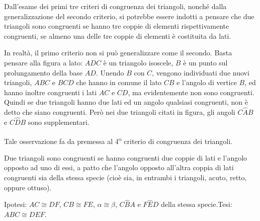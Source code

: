 \osservazione Dall'esame dei primi tre criteri di congruenza dei triangoli, nonché dalla generalizzazione del secondo criterio, si potrebbe essere indotti a pensare che due triangoli sono congruenti se hanno tre coppie di elementi rispettivamente congruenti, se almeno una delle tre coppie di elementi è costituita da lati.

\noindent \begin{minipage}{0.6\textwidth}
In realtà, il primo criterio non si può generalizzare come il secondo. Basta pensare alla figura a lato: $ADC$ è un triangolo isoscele, $B$ è un punto sul prolungamento della base $AD$. Unendo $B$ con $C$, vengono individuati due nuovi triangoli, $ABC$ e $BCD$ che hanno in comune il lato $CB$ e l'angolo di vertice $B$, ed hanno inoltre congruenti i lati $AC$ e $CD$, ma evidentemente non sono congruenti. Quindi se due triangoli hanno due lati ed un angolo qualsiasi congruenti, non è detto che siano congruenti. Però nei due triangoli citati in figura, gli angoli $C\widehat{A}B$ e $C\widehat{D}B$ sono supplementari.
\end{minipage}\hfil
\begin{minipage}{0.4\textwidth}
\centering
\end{minipage}

Tale osservazione fa da premessa al 4\textsuperscript{o} criterio di congruenza dei triangoli.
\begin{teorema}
Due triangoli sono congruenti se hanno congruenti due coppie di lati e l'angolo opposto ad uno di essi, a patto che l'angolo opposto all'altra coppia di lati congruenti sia della stessa specie (cioè sia, in entrambi i triangoli, acuto, retto, oppure ottuso).
\end{teorema}

\noindent Ipotesi: $AC\cong DF$, $CB\cong FE$, $\alpha\cong \beta$, $C\widehat{B}A$ e $F\widehat{E}D$ della stessa specie.\tab Tesi: $ABC\cong DEF$.

\begin{figure}[htb]
\centering
\end{figure}

